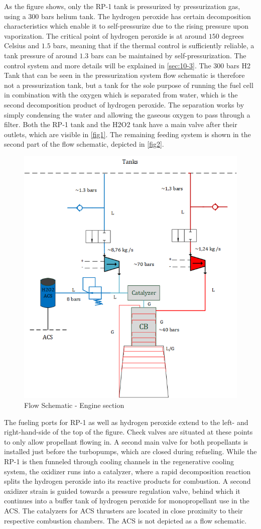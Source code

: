 As the figure shows, only the RP-1 tank is pressurized by pressurization gas, using a $300$ bars helium tank. The hydrogen peroxide has certain decomposition characteristics which enable it to self-pressurize due to the rising pressure upon vaporization. The critical point of hydrogen peroxide is at around $150$ degrees Celsius and $1.5$ bars, meaning that if the thermal control is sufficiently reliable, a tank pressure of around $1.3$ bars can be maintained by self-pressurization. The control system and more details will be explained in \autoref{sec:10-3}. The $300$ bars H2 Tank that can be seen in the pressurization system flow schematic is therefore not a pressurization tank, but a tank for the sole purpose of running the fuel cell in combination with the oxygen which is separated from water, which is the second decomposition product of hydrogen peroxide. The separation works by simply condensing the water and allowing the gaseous oxygen to pass through a filter. Both the RP-1 tank and the H2O2 tank have a main valve after their outlets, which are visible in \autoref{fig1}. The remaining feeding system is shown in the second part of the flow schematic, depicted in \autoref{fig2}.

\begin{figure}[H]
	\centering\includegraphics[width=0.7\linewidth]{flowenginesection}
	\caption{Flow Schematic - Engine section}\label{fig2}
\end{figure}
The fueling ports for RP-1 as well as hydrogen peroxide extend to the left- and right-hand-side of the top of the figure. Check valves are situated at these points to only allow propellant flowing in. A second main valve for both propellants is installed just before the turbopumps, which are closed during refueling. While the RP-1 is then funneled through cooling channels in the regenerative cooling system, the oxidizer runs into a catalyzer, where a rapid decomposition reaction splits the hydrogen peroxide into its reactive products for combustion. A second oxidizer strain is guided towards a pressure regulation valve, behind which it continues into a buffer tank of hydrogen peroxide for monopropellant use in the ACS. The catalyzers for ACS thrusters are located in close proximity to their respective combustion chambers. The ACS is not depicted as a flow schematic.
